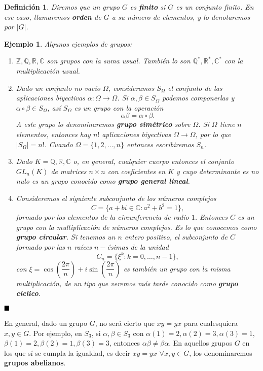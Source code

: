 \documentclass[12pt]{article}
\newtheorem{definition}[theorem]{Definición}
\newtheorem{example}{Ejemplo}[theorem]
\begin{document}
\begin{definition}Diremos que un grupo $G$ es \textbf{finito} si $G$ es un conjunto finito. En ese caso, llamaremos \textbf{orden} de $G$ a su número de elementos, y lo denotaremos por $|G|$.
\end{definition}

\begin{example} Algunos ejemplos de grupos:
\begin{enumerate}
\item $\mathbb{Z}, \mathbb{Q}, \mathbb{R}, \mathbb{C}$ son grupos con la suma usual. También lo son $\mathbb{Q}^*, \mathbb{R}^*, \mathbb{C}^*$ con la multiplicación usual.
\item Dado un conjunto no vacío $\Omega$, consideramos $S_{\Omega}$ el conjunto de las aplicaciones biyectivas $\alpha \colon \Omega \longrightarrow \Omega$. Si $\alpha, \beta \in S_{\Omega}$ podemos componerlas y $\alpha \circ \beta \in S_{\Omega}$, así $S_{\Omega}$ es un grupo con la operación $$\alpha \beta = \alpha \circ \beta.$$ A este grupo lo denominaremos \textbf{grupo simétrico} sobre $\Omega$. Si $\Omega$ tiene $n$ elementos, entonces hay $n!$ aplicaciones biyectivas $\Omega \longrightarrow \Omega$, por lo que $|S_{\Omega}| = n!$. Cuando $\Omega = \lbrace 1, 2, \ldots, n \rbrace$ entonces escribiremos $S_{n}$.
\item Dado $K = \mathbb{Q}, \mathbb{R}, \mathbb{C}$ o, en general, cualquier cuerpo entonces el conjunto $GL_{n}(K)$ de matrices $n\times n$ con coeficientes en $K$ y cuyo determinante es no nulo es un grupo conocido como \textbf{grupo general lineal}.
\item Consideremos el siguiente subconjunto de los números complejos $$C = \lbrace a+bi \in \mathbb{C}: a^2+b^2 = 1 \rbrace,$$ formado por los elementos de la circunferencia de radio $1$. Entonces $C$ es un grupo con la multiplicación de números complejos. Es lo que conocemos como \textbf{grupo circular}. Si tenemos un $n$ entero positivo, el subconjunto de $C$ formado por las $n$ raíces $n-$ésimas de la unidad $$C_{n}= \lbrace \xi^k : k =0, \ldots, n-1 \rbrace,$$ con $\xi = \cos\left( \dfrac{2\pi}{n} \right) + i\sin\left(\dfrac{2\pi}{n}\right)$ es también un grupo con la misma multiplicación, de un tipo que veremos más tarde conocido como \textbf{grupo cíclico}.
\end{enumerate}
\end{example}
$\hfill \blacksquare$


En general, dado un grupo $G$, no será cierto que $xy = yx$ para cualesquiera $x,y \in G$. Por ejemplo, en $S_{3}$, si $\alpha, \beta \in S_{3}$ con $\alpha(1) = 2, \alpha (2)=3, \alpha (3) = 1$, $\beta (1)=2, \beta(2)=1, \beta (3) = 3$, entonces $\alpha \beta \neq \beta \alpha$. En aquellos grupos $G$ en los que sí se cumpla la igualdad, es decir $xy = yx$ $\forall x,y \in G$, los denominaremos \textbf{ grupos abelianos}.
\end{document}
